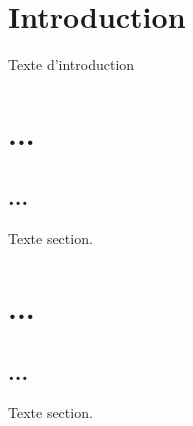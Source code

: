 \documentclass[11pt,a4paper,titlepage,openright]{report}
\begin{document}
    \renewcommand{\contentsname}{Sommaire}
    \tableofcontents


    \chapter*{Introduction}
    \Large
    Texte d'introduction %


    \normalsize
    \chapter{ ... }      %
    \section{ ... }      %
    Texte section.       %

    \chapter{ ... }      %
    \section{ ... }      %
    Texte section.       %

\end{document}
